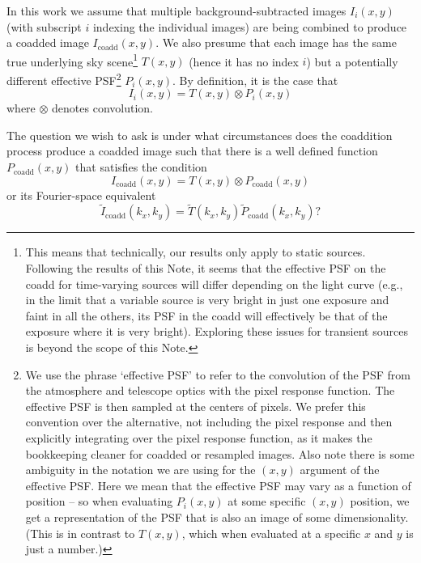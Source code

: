 \documentclass[modern]{style_and_logos/lsstdescnote}
\begin{document}
In this work we assume that multiple background-subtracted images $I_i(x,y)$ (with subscript $i$ indexing the individual images) are being combined to produce a coadded image $I_\text{coadd}(x,y)$.  We also presume that each image has the same true underlying sky scene\footnote{This means that technically, our results only apply to static sources.  Following the results of this Note, it seems that the effective PSF on the coadd for time-varying sources will differ depending on the light curve (e.g., in the limit that a variable source is very bright in just one exposure and faint in all the others, its PSF in the coadd will effectively be that of the exposure where it is very bright).  Exploring these issues for transient sources is beyond the scope of this Note.} $T(x,y)$ (hence it has no index $i$) but a potentially different effective PSF\footnote{We use the phrase `effective PSF' to refer to the convolution of the PSF from the atmosphere and telescope optics with the pixel response function.  The effective PSF is then sampled at the centers of pixels.  We prefer this convention over the alternative, not including the pixel response and then explicitly integrating over the pixel response function, as it makes the bookkeeping cleaner for coadded or resampled images. Also note there is some ambiguity in the notation we are using for the $(x,y)$ argument of the effective PSF.  Here we mean that the effective PSF may vary as a function of position -- so when evaluating $P_i(x,y)$ at some specific $(x,y)$ position, we get a representation of the PSF that is also an image of some dimensionality.  (This is in contrast to $T(x,y)$, which when evaluated at a specific $x$ and $y$ is just a number.)} $P_i(x,y)$.  By definition, it is the case that
\begin{equation}
I_i(x,y) = T(x,y) \otimes P_i(x,y)    
\end{equation}
where $\otimes$ denotes convolution.

The question we wish to ask is under what circumstances does the coaddition process produce a coadded image such that there is a well defined function $P_\text{coadd}(x,y)$ that satisfies the condition
\begin{equation}\label{eq:coaddpsf}
    I_\text{coadd}(x,y) = T(x,y) \otimes P_\text{coadd}(x,y)
\end{equation}
or its Fourier-space equivalent 
\begin{equation}\label{eq:kcoaddpsf}
    \widetilde{I}_\text{coadd}(k_x,k_y) = \widetilde{T}(k_x,k_y) \widetilde{P}_\text{coadd}(k_x,k_y)?
\end{equation}
\end{document}
